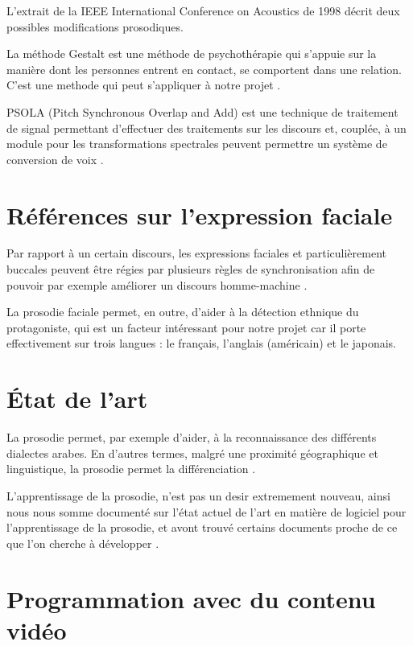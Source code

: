 L'extrait de la IEEE International Conference on Acoustics de 1998 \cite{Acero:ICASSP98-II-881} décrit deux possibles modifications prosodiques.

La méthode Gestalt est une méthode de psychothérapie qui s'appuie sur la manière dont les personnes entrent en contact, se comportent dans une relation. C'est une methode qui peut s'appliquer à notre projet \cite{auberge2002gestalt}.

PSOLA (Pitch Synchronous Overlap and Add) est une technique de traitement de signal permettant d'effectuer des traitements sur les discours et, couplée, à un module pour les transformations spectrales peuvent permettre un système de conversion de voix \cite{valbret1992voice}.

\section{Références sur l'expression faciale}\label{ref_transfo_faciales}

Par rapport à un certain discours, les expressions faciales et particulièrement buccales peuvent être régies par plusieurs règles de synchronisation afin de pouvoir par exemple améliorer un discours homme-machine \cite{beskow1995rule} .

La prosodie faciale permet, en outre, d'aider à la détection ethnique du protagoniste, qui est un facteur intéressant pour notre projet car il porte effectivement sur trois langues : le français, l'anglais (américain) et le japonais\cite{matsumoto1992american}.


\section{État de l'art}\label{state_of_the_art}

La prosodie permet, par exemple d'aider, à la reconnaissance des différents dialectes arabes. En d'autres termes, malgré une proximité géographique et linguistique, la prosodie permet la différenciation \cite{rouas2006identification}.

L'apprentissage de la prosodie, n'est pas un desir extremement nouveau, ainsi nous nous somme documenté sur l'état actuel de l'art en matière de logiciel pour l'apprentissage de la prosodie, et avont trouvé certains documents proche de ce que l'on cherche à développer \cite{10.4000/alsic.332}. 

\section{Programmation avec du contenu vidéo}

